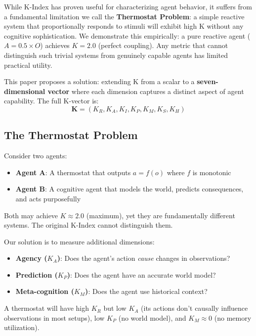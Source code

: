 \documentclass[11pt,a4paper]{article}
\newcommand{\kr}{K_R}
\newcommand{\ka}{K_A}
\newcommand{\ki}{K_I}
\newcommand{\kp}{K_P}
\newcommand{\km}{K_M}
\newcommand{\ks}{K_S}
\newcommand{\kh}{K_H}
\newcommand{\kvec}{\mathbf{K}}
\begin{document}
While K-Index has proven useful for characterizing agent behavior, it suffers from a fundamental limitation we call the \textbf{Thermostat Problem}: a simple reactive system that proportionally responds to stimuli will exhibit high K without any cognitive sophistication. We demonstrate this empirically: a pure reactive agent ($A = 0.5 \times O$) achieves $K = 2.0$ (perfect coupling). Any metric that cannot distinguish such trivial systems from genuinely capable agents has limited practical utility.

This paper proposes a solution: extending K from a scalar to a \textbf{seven-dimensional vector} where each dimension captures a distinct aspect of agent capability. The full K-vector is:
\begin{equation}
\kvec = (\kr, \ka, \ki, \kp, \km, \ks, \kh)
\end{equation}

\subsection{The Thermostat Problem}

Consider two agents:
\begin{itemize}
    \item \textbf{Agent A}: A thermostat that outputs $a = f(o)$ where $f$ is monotonic
    \item \textbf{Agent B}: A cognitive agent that models the world, predicts consequences, and acts purposefully
\end{itemize}

Both may achieve $K \approx 2.0$ (maximum), yet they are fundamentally different systems. The original K-Index cannot distinguish them.

Our solution is to measure additional dimensions:
\begin{itemize}
    \item \textbf{Agency ($\ka$)}: Does the agent's action \emph{cause} changes in observations?
    \item \textbf{Prediction ($\kp$)}: Does the agent have an accurate world model?
    \item \textbf{Meta-cognition ($\km$)}: Does the agent use historical context?
\end{itemize}

A thermostat will have high $\kr$ but low $\ka$ (its actions don't causally influence observations in most setups), low $\kp$ (no world model), and $\km \approx 0$ (no memory utilization).
\end{document}
